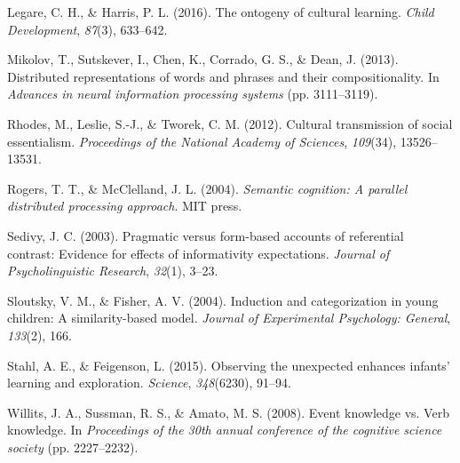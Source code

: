 \documentclass[10pt, letterpaper]{article}
\begin{document}
\leavevmode\hypertarget{ref-legare2016}{}%
Legare, C. H., \& Harris, P. L. (2016). The ontogeny of cultural
learning. \emph{Child Development}, \emph{87}(3), 633--642.

\leavevmode\hypertarget{ref-mikolov2013}{}%
Mikolov, T., Sutskever, I., Chen, K., Corrado, G. S., \& Dean, J.
(2013). Distributed representations of words and phrases and their
compositionality. In \emph{Advances in neural information processing
systems} (pp. 3111--3119).

\leavevmode\hypertarget{ref-rhodes2012}{}%
Rhodes, M., Leslie, S.-J., \& Tworek, C. M. (2012). Cultural
transmission of social essentialism. \emph{Proceedings of the National
Academy of Sciences}, \emph{109}(34), 13526--13531.

\leavevmode\hypertarget{ref-rogers2004}{}%
Rogers, T. T., \& McClelland, J. L. (2004). \emph{Semantic cognition: A
parallel distributed processing approach}. MIT press.

\leavevmode\hypertarget{ref-sedivy2003}{}%
Sedivy, J. C. (2003). Pragmatic versus form-based accounts of
referential contrast: Evidence for effects of informativity
expectations. \emph{Journal of Psycholinguistic Research}, \emph{32}(1),
3--23.

\leavevmode\hypertarget{ref-sloutsky2004}{}%
Sloutsky, V. M., \& Fisher, A. V. (2004). Induction and categorization
in young children: A similarity-based model. \emph{Journal of
Experimental Psychology: General}, \emph{133}(2), 166.

\leavevmode\hypertarget{ref-stahl2015}{}%
Stahl, A. E., \& Feigenson, L. (2015). Observing the unexpected enhances
infants' learning and exploration. \emph{Science}, \emph{348}(6230),
91--94.

\leavevmode\hypertarget{ref-willits2008}{}%
Willits, J. A., Sussman, R. S., \& Amato, M. S. (2008). Event knowledge
vs. Verb knowledge. In \emph{Proceedings of the 30th annual conference
of the cognitive science society} (pp. 2227--2232).


\end{document}
